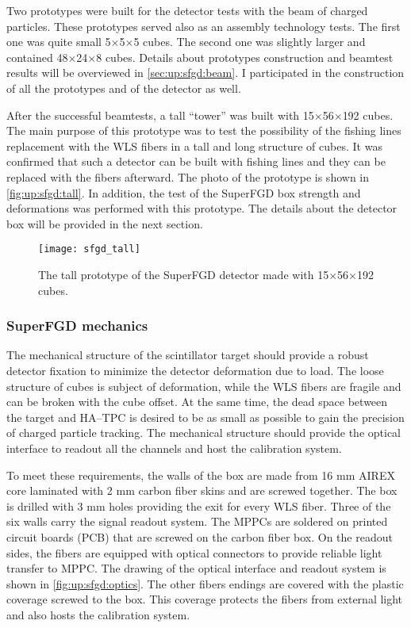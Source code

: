 \documentclass[main.tex]{subfiles}
\begin{document}
Two prototypes were built for the detector tests with the beam of charged particles. These prototypes served also as an assembly technology tests. The first one was quite small 5$\times$5$\times$5 cubes. The second one was slightly larger and contained 48$\times$24$\times$8 cubes. Details about prototypes construction and beamtest results will be overviewed in \autoref{sec:up:sfgd:beam}. I participated in the construction of all the prototypes and of the detector as well.

After the successful beamtests, a tall ``tower'' was built with 15$\times$56$\times$192 cubes. The main purpose of this prototype was to test the possibility of the fishing lines replacement with the WLS fibers in a tall and long structure of cubes. It was confirmed that such a detector can be built with fishing lines and they can be replaced with the fibers afterward. The photo of the prototype is shown in \autoref{fig:up:sfgd:tall}. In addition, the test of the SuperFGD box strength and deformations was performed with this prototype. The details about the detector box will be provided in the next section.

\begin{figure}[!ht]
	\centering
	\texttt{[image: sfgd\_tall]}
	\caption{The tall prototype of the SuperFGD detector made with 15$\times$56$\times$192 cubes.}
	\label{fig:up:sfgd:tall}
\end{figure}

\subsubsection{SuperFGD mechanics}
The mechanical structure of the scintillator target should provide a robust detector fixation to minimize the detector deformation due to load. The loose structure of cubes is subject of deformation, while the WLS fibers are fragile and can be broken with the cube offset. At the same time, the dead space between the target and HA--TPC is desired to be as small as possible to gain the precision of charged particle tracking. The mechanical structure should provide the optical interface to readout all the channels and host the calibration system.

To meet these requirements, the walls of the box are made from 16 mm AIREX core laminated with 2 mm carbon fiber skins and are screwed together. The box is drilled with 3 mm holes providing the exit for every WLS fiber. Three of the six walls carry the signal readout system. The MPPCs are soldered on printed circuit boards (PCB) that are screwed on the carbon fiber box. On the readout sides, the fibers are equipped with optical connectors to provide reliable light transfer to MPPC. The drawing of the optical interface and readout system is shown in \autoref{fig:up:sfgd:optics}. The other fibers endings are covered with the plastic coverage screwed to the box. This coverage protects the fibers from external light and also hosts the calibration system.
\end{document}
